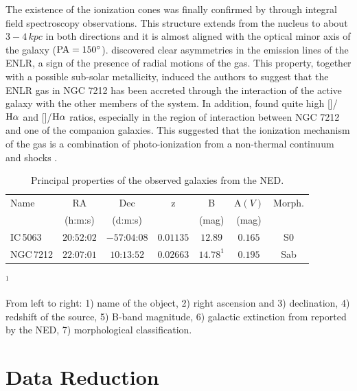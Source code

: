 \documentclass[../main.tex]{subfiles}
\begin{document}
The existence of the ionization cones was finally confirmed by \citet{Cracco11} through integral field spectroscopy observations.
This structure extends from the nucleus to about $3-4\,\si{kpc}$ in both directions and it is almost aligned with the optical minor axis of the galaxy ($\rm PA=\ang{150}$).
\citet{Cracco11} discovered clear asymmetries in the emission lines of the ENLR, a sign of the presence of radial motions of the gas. 
This property, together with a possible sub-solar metallicity, induced the authors to suggest that the ENLR gas in NGC 7212 has been accreted through the interaction of the active galaxy with the other members of the system. 
In addition, \citet{Cracco11} found quite high []/$\rm H\alpha$ and []/$\rm H\alpha$ ratios, especially in the region of interaction between NGC 7212 and one of the companion galaxies. 
This suggested that the ionization mechanism of the gas is a combination of photo-ionization from a non-thermal continuum and shocks \citep{Contini12}.
 
\begin{table}
\caption[]{Principal properties of the observed galaxies from the NED.}
\label{tab:sample}
\centering
\footnotesize
\begin{threeparttable}
\begin{tabular}{lcccccc}
\hline
Name&RA&Dec& z& B & A$(V)$& Morph.\\
&(h:m:s)&(d:m:s)& & (mag)&(mag)&\\
\hline
IC\,5063& $20$:$52$:$02$&$-57$:$04$:$08$&$0.01135$&$12.89$ &$0.165$&S0\\
NGC\,7212&$22$:$07$:$01$&$10$:$13$:$52$& $0.02663$&$14.78^1$& $0.195$&Sab\\
\hline
\end{tabular}
\small
\begin{tablenotes}
\item $^1$\cite{Munoz07}
\item From left to right: 1) name of the object, 2) right ascension and 3) declination, 4) redshift of the source, 5) B-band magnitude, 6) galactic extinction from \citet{Schlafly11} reported by the NED, 7) morphological classification.
\end{tablenotes}
\end{threeparttable}
\normalsize
\end{table}

\section{Data Reduction}
\label{sec:datared}
\end{document}
